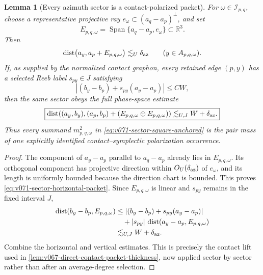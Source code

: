 \documentclass[10pt]{article}
\newtheorem{lemma}[theorem]{Lemma}
\newcommand{\Span}{\operatorname{Span}}
\begin{document}
\begin{lemma}[Every azimuth sector is a contact-polarized packet]
\label{lem:v071-sector-contact-packet}
For \(\omega\in\mathscr I_{p,q}\), choose a representative projective ray
\(e_\omega\subset(a_q-a_p)^\perp\), and set
\[
E_{p,q,\omega}
=
\Span\{a_q-a_p,e_\omega\}\subset\mathbb R^3.
\]
Then
\begin{equation}
\label{eq:v071-sector-horizontal-packet}
\operatorname{dist}
\bigl(a_y,a_p+E_{p,q,\omega}\bigr)
\lesssim_U\delta_{\rm az}
\qquad(y\in A_{p,q,\omega}).
\end{equation}
If, as supplied by the normalized contact graphon, every retained edge \((p,y)\) has a selected
Reeb label \(s_{py}\in J\) satisfying
\[
|(b_y-b_p)+s_{py}(a_y-a_p)|\le C W,
\]
then the same sector obeys the full phase-space estimate
\begin{equation}
\label{eq:v071-sector-contact-packet}
\boxed{
\operatorname{dist}\!\left(
(a_y,b_y),
(a_p,b_p)+(E_{p,q,\omega}\oplus E_{p,q,\omega})
\right)
\lesssim_{U,J}W+\delta_{\rm az}.
}
\end{equation}
Thus every summand \(m_{p,q,\omega}^2\) in
\eqref{eq:v071-sector-square-anchored} is the pair mass of one explicitly identified
contact--symplectic polarization occurrence.
\end{lemma}

\begin{proof}
The component of \(a_y-a_p\) parallel to \(a_q-a_p\) already lies in
\(E_{p,q,\omega}\).  Its orthogonal component has projective direction within
\(O_U(\delta_{\rm az})\) of \(e_\omega\), and its length is uniformly bounded because the
direction chart is bounded.  This proves \eqref{eq:v071-sector-horizontal-packet}.  Since
\(E_{p,q,\omega}\) is linear and \(s_{py}\) remains in the fixed interval \(J\),
\[
\begin{aligned}
\operatorname{dist}(b_y-b_p,E_{p,q,\omega})
&\le |(b_y-b_p)+s_{py}(a_y-a_p)|\\
&\quad+|s_{py}|\,
\operatorname{dist}(a_y-a_p,E_{p,q,\omega})\\
&\lesssim_{U,J}W+\delta_{\rm az}.
\end{aligned}
\]
Combine the horizontal and vertical estimates.  This is precisely the contact lift used in
\cref{lem:v067-direct-contact-packet-thickness}, now applied sector by sector rather than after an
average-degree selection.
\end{proof}
\end{document}
